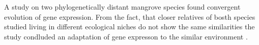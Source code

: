 A study on two phylogenetically distant mangrove species found
convergent evolution of gene expression. From the fact, that closer
relatives of bosth species studied living in different ecological
niches do not show the same similarities the study condluded an
adaptation of gene expresson to the similar environment
\cite{dassanayake2009shedding}.






     